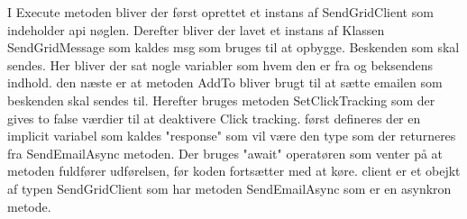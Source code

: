 I Execute metoden bliver der først oprettet et instans af SendGridClient som indeholder api nøglen.
Derefter bliver der lavet et instans af Klassen SendGridMessage som kaldes msg som bruges til at opbygge. 
Beskenden som skal sendes. Her bliver der sat nogle variabler som hvem den er fra og beksendens indhold. 
den næste er at metoden AddTo bliver brugt til at sætte emailen som beskenden skal sendes til. Herefter bruges metoden 
SetClickTracking som der gives to false værdier til at deaktivere Click tracking. først defineres der en implicit variabel 
som kaldes "response" som vil være den type som der returneres fra SendEmailAsync metoden. Der bruges "await" operatøren som venter
på at metoden fuldfører udførelsen, før koden fortsætter med at køre. client er et obejkt af typen SendGridClient som har metoden
SendEmailAsync som er en asynkron metode.

